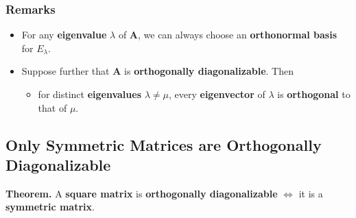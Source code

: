 \documentclass[../ma2001_notes.tex]{subfiles}
\begin{document}
\subsubsection{Remarks}
\begin{itemize}
	\item For any \textbf{eigenvalue} \(\lambda\) of \(\bm{A}\), we can always choose an \textbf{orthonormal basis} for \(E_\lambda\).
	\item Suppose further that \(\bm{A}\) is \textbf{orthogonally diagonalizable}. Then
	\begin{itemize}
		\item for distinct \textbf{eigenvalues} \(\lambda\ne\mu\), every \textbf{eigenvector} of \(\lambda\) is \textbf{orthogonal} to that of \(\mu\).
	\end{itemize}
\end{itemize}

\subsection{Only Symmetric Matrices are Orthogonally Diagonalizable}
\textbf{Theorem.} A \textbf{square matrix} is \textbf{orthogonally diagonalizable} \(\Leftrightarrow\) it is a \textbf{symmetric matrix}.
\end{document}
